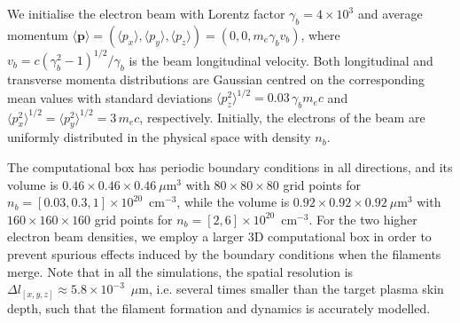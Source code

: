 \documentclass[fleqn,11pt]{wlscirep}
\begin{document}
We initialise the electron beam with Lorentz factor $\gamma_b=4\times10^3$ and average momentum $\langle \boldsymbol{p}\rangle=(\langle p_x\rangle,\langle p_y\rangle,\langle p_z\rangle)=(0,0,m_e\gamma_bv_b)$, where $v_b=c(\gamma_b^2-1)^{1/2}/\gamma_b$ is the beam longitudinal velocity. 
Both longitudinal and transverse momenta distributions are Gaussian centred on the corresponding mean values with standard deviations $\langle p_{z}^2\rangle^{1/2}=0.03\,\gamma_bm_ec$ and $\langle p_{x}^2\rangle^{1/2}=\langle p_{y}^2\rangle^{1/2}=3\,m_ec$, respectively. Initially, the electrons of the beam are uniformly distributed in the physical space with density $n_b$. 

The computational box has periodic boundary conditions in all directions, and its volume is $0.46\times0.46\times0.46~\mu\text{m}^3$ with $80\times80\times80$ grid points for $n_b=[0.03,0.3,1]\times10^{20}$~cm$^{-3}$, while the volume is $0.92\times0.92\times0.92~\mu\text{m}^3$ with $160\times160\times160$ grid points for $n_b=[2,6]\times10^{20}$~cm$^{-3}$. For the two higher electron beam densities, we employ a larger 3D computational box in order to prevent spurious effects induced by the boundary conditions when  the filaments merge. Note that in all the simulations, the spatial resolution is $\Delta l_{[x,y,z]}\approx5.8\times10^{-3}$~$\mu$m, i.e. several times smaller than the target plasma skin depth, such that the filament formation and dynamics is accurately modelled.
\end{document}
